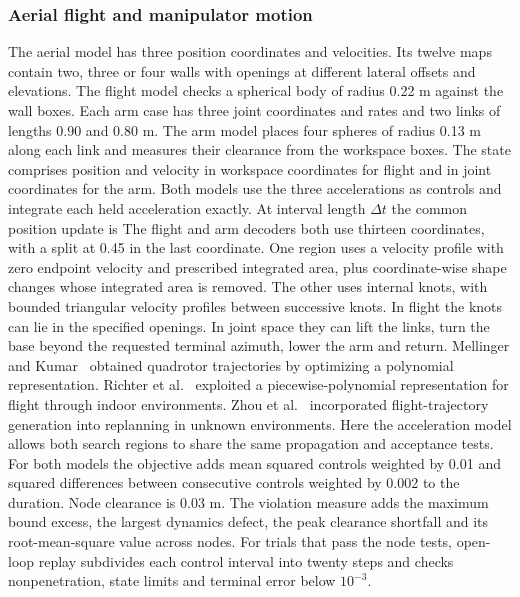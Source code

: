 \subsubsection{Aerial flight and manipulator motion} The aerial model has three position coordinates and velocities. Its twelve maps contain two, three or four walls with openings at different lateral offsets and elevations. The flight model checks a spherical body of radius 0.22 m against the wall boxes. Each arm case has three joint coordinates and rates and two links of lengths 0.90 and 0.80 m. The arm model places four spheres of radius 0.13 m along each link and measures their clearance from the workspace boxes. The state comprises position and velocity in workspace coordinates for flight and in joint coordinates for the arm. Both models use the three accelerations as controls and integrate each held acceleration exactly. At interval length $\Delta t$ the common position update is
The flight and arm decoders both use thirteen coordinates, with a split at 0.45 in the last coordinate. One region uses a velocity profile with zero endpoint velocity and prescribed integrated area, plus coordinate-wise shape changes whose integrated area is removed. The other uses internal knots, with bounded triangular velocity profiles between successive knots. In flight the knots can lie in the specified openings. In joint space they can lift the links, turn the base beyond the requested terminal azimuth, lower the arm and return. Mellinger and Kumar~\cite{snap} obtained quadrotor trajectories by optimizing a polynomial representation. Richter et al.~\cite{uav} exploited a piecewise-polynomial representation for flight through indoor environments. Zhou et al.~\cite{fast} incorporated flight-trajectory generation into replanning in unknown environments. Here the acceleration model allows both search regions to share the same propagation and acceptance tests. For both models the objective adds mean squared controls weighted by 0.01 and squared differences between consecutive controls weighted by 0.002 to the duration. Node clearance is 0.03 m. The violation measure adds the maximum bound excess, the largest dynamics defect, the peak clearance shortfall and its root-mean-square value across nodes. For trials that pass the node tests, open-loop replay subdivides each control interval into twenty steps and checks nonpenetration, state limits and terminal error below $10^{-3}$.

